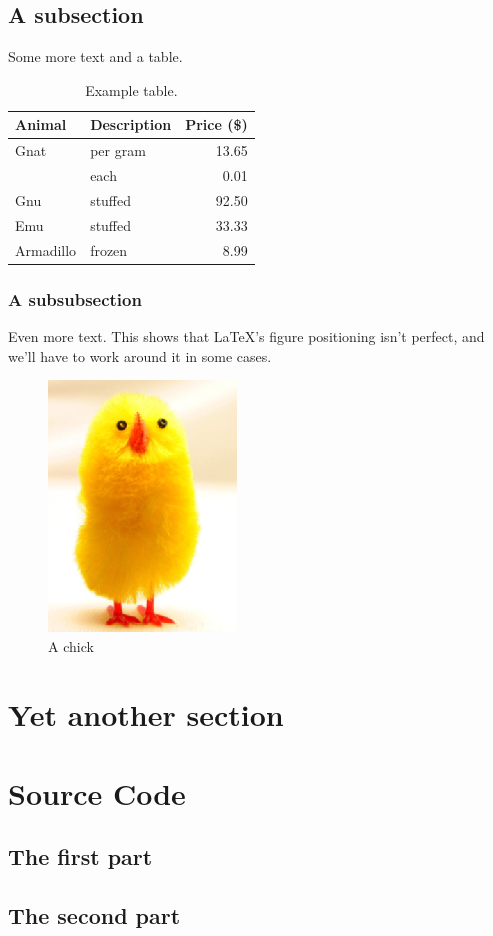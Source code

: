\documentclass[12pt]{article} %
\begin{document}
\subsection{A subsection}

Some more text and a table. \\

\begin{table}[h]
    \centering
    \label{table:ex}
    \begin{tabular}{llr}
        \toprule
        Animal    & Description & Price (\$) \\
        \midrule
        Gnat      & per gram    & 13.65      \\
                  & each        & 0.01       \\
        Gnu       & stuffed     & 92.50      \\
        Emu       & stuffed     & 33.33      \\
        Armadillo & frozen      & 8.99       \\
        \bottomrule
    \end{tabular}
    \caption{Example table.}
\end{table}


\subsubsection{A subsubsection}

Even more text. This shows that \LaTeX's figure positioning isn't perfect, and we'll have to work around it in some cases.

\begin{figure}[h]
    \centering
    \label{figure:chick}
    \includegraphics{figure1.png}
    \caption{A chick}
\end{figure}

\section{Yet another section}

\pagebreak
\appendix

\section{Source Code}
\subsection{The first part}


\subsection{The second part}

\end{document}
